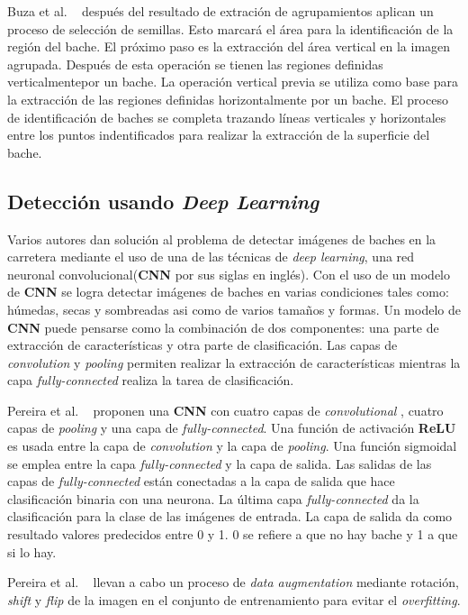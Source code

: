 		Buza et al. ~ después del resultado de extración de agrupamientos aplican un proceso de selección de semillas.
		Esto marcará el área para la identificación de la región del bache. El próximo paso es la extracción del área vertical en la imagen agrupada.
		Después de esta operación se tienen las regiones definidas verticalmentepor un bache. La operación vertical previa se utiliza como base para 
		la extracción de las regiones definidas horizontalmente por un bache. El proceso de identificación de baches se completa trazando líneas verticales 
		y horizontales entre los puntos indentificados para realizar la extracción de la superficie del bache.

	\subsection{Detección usando \emph{Deep Learning}}
	Varios autores dan solución al problema de detectar imágenes de baches en la carretera mediante el uso de una de las técnicas  
	de \emph{deep learning}, una red neuronal convolucional(\textbf{CNN} por sus siglas en inglés). Con el uso de un modelo de \textbf{CNN} se logra  
	detectar imágenes de baches en varias condiciones tales como: húmedas, secas y sombreadas asi como de varios tamaños y formas.
	Un modelo de \textbf{CNN} puede pensarse como la combinación de dos componentes: una parte de extracción de características
	y otra parte de clasificación. Las capas de \emph{convolution} y \emph{pooling}  permiten realizar la extracción de características
	mientras la capa \emph{fully-connected} realiza la tarea de clasificación. 

	Pereira et al. ~ proponen una \textbf{CNN} con cuatro capas de \emph{convolutional} , cuatro
	capas de \emph{pooling} y una capa de \emph{fully-connected}. Una función de activación \textbf{ReLU} es usada entre 
	la capa de \emph{convolution} y la capa de \emph{pooling}. Una función sigmoidal se emplea entre la capa \emph{fully-connected}
	y la capa de salida. Las salidas de las capas de \emph{fully-connected} están conectadas a la capa de salida que hace 
	clasificación binaria con una neurona. La última capa \emph{fully-connected} da la clasificación para la clase de las imágenes de entrada.
	La capa de salida da como resultado  valores predecidos entre 0 y 1. 0 se refiere a que no hay bache y 1 a que si lo hay.


	Pereira et al. ~ llevan a cabo un proceso de \emph{data augmentation} mediante rotación, \emph{shift} y \emph{flip}
	de la imagen en el conjunto de entrenamiento para evitar el \emph{overfitting}.

